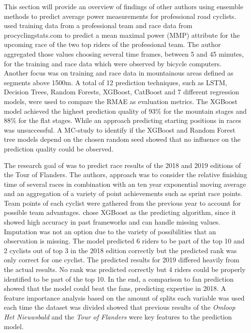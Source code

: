 \documentclass[12pt,a4paper]{article}
\begin{document}
This section will provide an overview of findings of other authors using ensemble methods to predict average power measurements for professional road cyclists. \textcite{Karetnikov2019} used training data from a professional team and race data from procyclingstats.com to predict a mean maximal power (MMP) attribute for the upcoming race of the two top riders of the professional team. The author aggregated those values choosing several time frames, between 5 and 45 minutes, for the training and race data which were observed by bicycle computers. Another focus was on training and race data in mountainous areas defined as segments above 1500m. A total of 12 prediction techniques, such as LSTM, Decision Trees, Random Forests, XGBoost, CatBoost and 7 different regression models, were used to compare the RMAE as evaluation metrics. The XGBoost model achieved the highest prediction quality of 93\% for the mountain stages and 88\% for the flat stages. While an approach predicting starting positions in races was unsuccessful. A MC-study to identify if the XGBoost and Random Forest tree models depend on the chosen random seed showed that no influence on the prediction quality could be observed.

The research goal of \textcite{Kholkine2020} was to predict race results of the 2018 and 2019 editions of the Tour of Flanders. The authors, approach was to consider the relative finishing time of several races in combination with an ten year exponential moving average and an aggregation of a variety of point achievements such as sprint race points. Team points of each cyclist were gathered from the previous year to account for possible team advantages. \textcite{Kholkine2020} chose XGBoost as the predicting algorithm, since it showed high accuracy in past frameworks and can handle missing values. Imputation was not an option due to the variety of possibilities that an observation is missing. The model predicted 6 riders to be part of the top 10 and 2 cyclists out of top 3 in the 2018 edition correctly but the predicted rank was only correct for one cyclist. The predicted results for 2019 differed heavily from the actual results. No rank was predicted correctly but 4 riders could be properly identified to be part of the top 10. In the end, a comparison to fan prediction showed that the model could beat the fans, predicting expertise in 2018. A feature importance analysis based on the amount of splits each variable was used each time the dataset was divided showed that previous results of the \textit{Omloop Het Nieuwsbald} and the \textit{Tour of Flanders} were key features to the prediction model.
\end{document}
